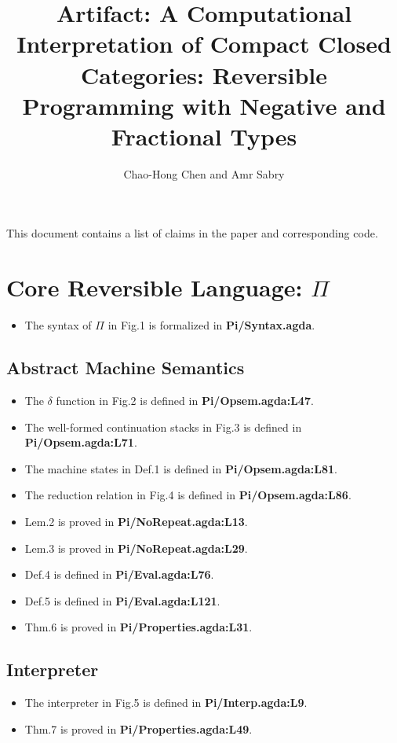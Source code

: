 \documentclass[12pt]{article}
\begin{document}
\title{Artifact: A Computational Interpretation of Compact Closed Categories: Reversible Programming with Negative and Fractional Types}
\author{Chao-Hong Chen and Amr Sabry}
\maketitle
\noindent
This document contains a list of claims in the paper and corresponding code.

\section{Core Reversible Language: $\Pi$}

\begin{itemize}
\item The syntax of $\Pi$ in Fig.1 is formalized in \textbf{Pi/Syntax.agda}.
\end{itemize}

\subsection{Abstract Machine Semantics}
\begin{itemize}
\item The $\delta$ function in Fig.2 is defined in \textbf{Pi/Opsem.agda:L47}.
\item The well-formed continuation stacks in Fig.3 is defined in \textbf{Pi/Opsem.agda:L71}.
\item The machine states in Def.1 is defined in \textbf{Pi/Opsem.agda:L81}.
\item The reduction relation in Fig.4 is defined in \textbf{Pi/Opsem.agda:L86}.
\item Lem.2 is proved in \textbf{Pi/NoRepeat.agda:L13}.
\item Lem.3 is proved in \textbf{Pi/NoRepeat.agda:L29}.
\item Def.4 is defined in \textbf{Pi/Eval.agda:L76}.
\item Def.5 is defined in \textbf{Pi/Eval.agda:L121}.
\item Thm.6 is proved in \textbf{Pi/Properties.agda:L31}.
\end{itemize}
\subsection{Interpreter}
\begin{itemize}
\item The interpreter in Fig.5 is defined in \textbf{Pi/Interp.agda:L9}.
\item Thm.7 is proved in \textbf{Pi/Properties.agda:L49}.
\end{itemize}
\end{document}
